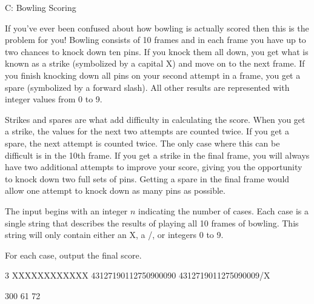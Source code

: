 \begin{problem}{C: Bowling Scoring}

If you’ve ever been confused about how bowling is actually scored then this is the problem for you! Bowling consists of 10 frames and in each frame you have up to two chances to knock down ten pins. If you knock them all down, you get what is known as a strike (symbolized by a capital X) and move on to the next frame. If you finish knocking down all pins on your second attempt in a frame, you get a spare (symbolized by a forward slash). All other results are represented with integer values from 0 to 9.

Strikes and spares are what add difficulty in calculating the score. When you get a strike, the values for the next two attempts are counted twice. If you get a spare, the next attempt is counted twice. The only case where this can be difficult is in the 10th frame. If you get a strike in the final frame, you will always have two additional attempts to improve your score, giving you the opportunity to knock down two full sets of pins. Getting a spare in the final frame would allow one attempt to knock down as many pins as possible.
\end{problem}

\begin{formalin}
The input begins with an integer $n$ indicating the number of cases. Each case is a single string that describes the results of playing all 10 frames of bowling. This string will only contain either an X, a /, or integers 0 to 9. 
\end{formalin}

\begin{formalout}
For each case, output the final score.
\end{formalout}

\begin{datain}
3
XXXXXXXXXXXX
43127190112750900090
4312719011275090009/X
\end{datain}

\begin{dataout}
300
61
72
\end{dataout}
